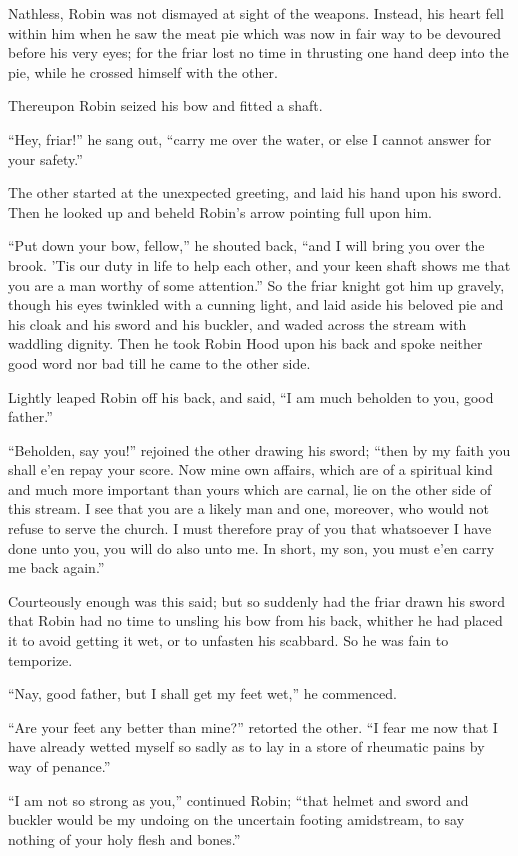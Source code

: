 Nathless, Robin was not dismayed at sight of the weapons. Instead, his
heart fell within him when he saw the meat pie which was now in fair way
to be devoured before his very eyes; for the friar lost no time in
thrusting one hand deep into the pie, while he crossed himself with the
other.

Thereupon Robin seized his bow and fitted a shaft.

``Hey, friar!'' he sang out, ``carry me over the water, or else I cannot
answer for your safety.''

The other started at the unexpected greeting, and laid his hand upon his
sword. Then he looked up and beheld Robin's arrow pointing full upon
him.

``Put down your bow, fellow,'' he shouted back, ``and I will bring you
over the brook. 'Tis our duty in life to help each other, and your keen
shaft shows me that you are a man worthy of some attention.'' So the
friar knight got him up gravely, though his eyes twinkled with a cunning
light, and laid aside his beloved pie and his cloak and his sword and
his buckler, and waded across the stream with waddling dignity. Then he
took Robin Hood upon his back and spoke neither good word nor bad till
he came to the other side.

Lightly leaped Robin off his back, and said, ``I am much beholden to
you, good father.''

``Beholden, say you!'' rejoined the other drawing his sword; ``then by
my faith you shall e'en repay your score. Now mine own affairs, which
are of a spiritual kind and much more important than yours which are
carnal, lie on the other side of this stream. I see that you are a
likely man and one, moreover, who would not refuse to serve the church.
I must therefore pray of you that whatsoever I have done unto you, you
will do also unto me. In short, my son, you must e'en carry me back
again.''

Courteously enough was this said; but so suddenly had the friar drawn
his sword that Robin had no time to unsling his bow from his back,
whither he had placed it to avoid getting it wet, or to unfasten his
scabbard. So he was fain to temporize.

``Nay, good father, but I shall get my feet wet,'' he commenced.

``Are your feet any better than mine?'' retorted the other. ``I fear me
now that I have already wetted myself so sadly as to lay in a store of
rheumatic pains by way of penance.''

``I am not so strong as you,'' continued Robin; ``that helmet and sword
and buckler would be my undoing on the uncertain footing amidstream, to
say nothing of your holy flesh and bones.''

